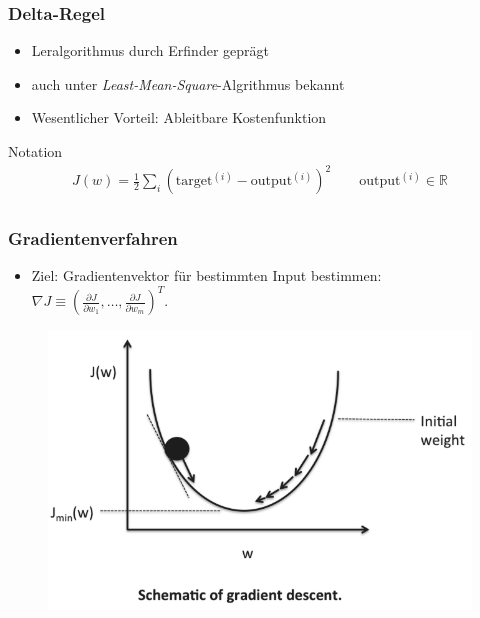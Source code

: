 \begin{frame}
\frametitle{Delta-Regel}

\begin{itemize}
\item Leralgorithmus durch Erfinder geprägt
\item auch unter \emph{Least-Mean-Square}-Algrithmus bekannt
\item Wesentlicher Vorteil: Ableitbare Kostenfunktion
\end{itemize}

\hspace{2mm}

\begin{block}{Notation}
\begin{align*}
J(w)  = \frac{1}{2} \sum_{i} (\text{target}^{(i)} - \text{output}^{(i)})^2 \quad \quad \text{output}^{(i)} \in \mathbb{R} \\
\end{align*}
\end{block}

\end{frame}



\begin{frame}
\frametitle{Gradientenverfahren}

\hspace{1.5mm}

\begin{itemize}
\item Ziel: Gradientenvektor für bestimmten Input bestimmen: $\nabla J \equiv \left(\frac{\partial J}{\partial w_1}, \ldots, \frac{\partial J}{\partial w_m}\right)^T.$
\end{itemize}


\begin{figure}
\includegraphics[width=.8\linewidth]{./geschichtliches/adeline/img/adeline_gd1_alpha}
\end{figure}

\end{frame}


